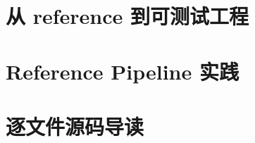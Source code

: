\documentclass[UTF8,openany,zihao=5,fontset=none]{ctexbook}
\begin{document}
\frontmatter




\tableofcontents

\mainmatter

\part{从 reference 到可测试工程}


\part{Reference Pipeline 实践}


\part{逐文件源码导读}


\backmatter


\printindex
\end{document}
